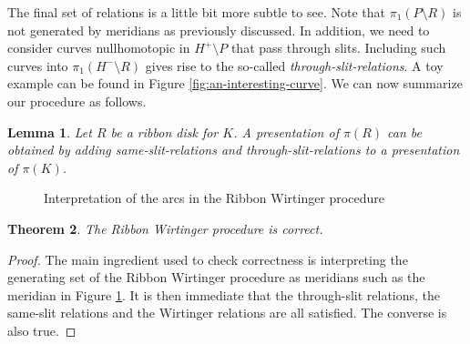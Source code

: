 \documentclass{article}
\newtheorem{theorem}{Theorem}[section]
\newtheorem{lemma}[theorem]{Lemma}
\theoremstyle{definition}
\begin{document}
The final set of relations is a little bit more subtle to see. Note that $\pi_1(P \setminus R)$ is not generated by meridians as previously discussed. In addition, we need to consider curves nullhomotopic in $H^+ \setminus P$ that pass through slits. Including such curves into $\pi_1(H^- \setminus R)$ gives rise to the so-called \textit{through-slit-relations}. A toy example can be found in Figure \ref{fig:an-interesting-curve}. We can now summarize our procedure as follows.

\begin{lemma}
Let $R$ be a ribbon disk for $K$.
A presentation of $\pi(R)$ can be obtained by adding same-slit-relations and through-slit-relations to a presentation of $\pi(K)$.
\end{lemma}

\begin{figure}[htb]
\centering
\begin{minipage}{0.5\textwidth}
\centering
{}
\end{minipage}%
\begin{minipage}{0.5\textwidth}
\centering
{}
\end{minipage}
\caption{Interpretation of the arcs in the Ribbon Wirtinger procedure}
\label{fig:arcs-interpretation}
\end{figure}


\begin{theorem}
The Ribbon Wirtinger procedure is correct.
\end{theorem}

\begin{proof}
The main ingredient used to check correctness is interpreting the generating set of the Ribbon Wirtinger procedure as meridians such as the meridian in Figure \ref{fig:arcs-interpretation}. It is then immediate that the through-slit relations, the same-slit relations and the Wirtinger relations are all satisfied. The converse is also true.
\end{proof}
\end{document}
